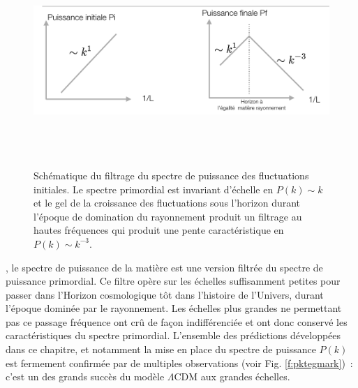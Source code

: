 \begin{figure}[htbp]
	\centering
		\includegraphics[height=8cm]{figs/pk.png}
		\caption[Schématique du filtrage du spectre de puissance des fluctuations initiales.]{Schématique du filtrage du spectre de puissance des fluctuations initiales. Le spectre primordial est invariant d'échelle en $P(k)\sim k$ et le gel de la croissance des fluctuations sous l'horizon durant l'époque de domination du rayonnement produit un filtrage au hautes fréquences qui produit une pente caractéristique en $P(k)\sim k^{-3}$.}
	\label{f:pk}
\end{figure}

, le spectre de puissance de la matière est une version filtrée du spectre de puissance primordial. Ce filtre opère sur les échelles suffisamment petites pour passer dans l'Horizon cosmologique tôt dans l'histoire de l'Univers, durant l'époque dominée par le rayonnement. Les échelles plus grandes ne permettant pas ce passage fréquence ont crû de façon indifférenciée et ont donc conservé les caractéristiques du spectre primordial. L'ensemble des prédictions développées dans ce chapitre, et notamment la mise en place du spectre de puissance $P(k)$ est fermement confirmée par de multiples observations (voir Fig. \ref{f:pktegmark})~: c'est un des grands succès du modèle $\Lambda$CDM aux grandes échelles.

